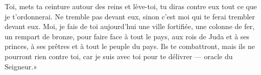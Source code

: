 Toi, mets ta ceinture autour des reins et lève-toi,
	tu diras contre eux tout ce que je t’ordonnerai.
Ne tremble pas devant eux, sinon c’est moi qui te ferai trembler devant eux.
Moi, je fais de toi aujourd’hui une ville fortifiée,
	une colonne de fer, un rempart de bronze,
	pour faire face à tout le pays,
	aux rois de Juda et à ses princes,
	à ses prêtres et à tout le peuple du pays.
Ils te combattront, mais ils ne pourront rien contre toi,
	car je suis avec toi pour te délivrer --- oracle du Seigneur.»
